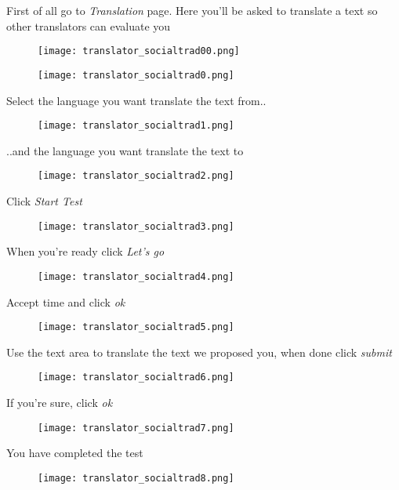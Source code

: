 \documentclass[11 pt, a4paper]{article}
\begin{document}
First of all go to \textit{Translation} page. Here you'll be asked to translate a text so other translators can evaluate you
\begin{figure}[H]
\centering
\texttt{[image: translator\_socialtrad00.png]}
\end{figure}

\begin{figure}[H]
\centering
\texttt{[image: translator\_socialtrad0.png]}
\end{figure}

Select the language you want translate the text from..
\begin{figure}[H]
\centering
\texttt{[image: translator\_socialtrad1.png]}
\end{figure}

..and the language you want translate the text to
\begin{figure}[H]
\centering
\texttt{[image: translator\_socialtrad2.png]}
\end{figure}

\clearpage
Click \textit{Start Test}
\begin{figure}[H]
\centering
\texttt{[image: translator\_socialtrad3.png]}
\end{figure}


When you're ready click \textit{Let's go}
\begin{figure}[H]
\centering
\texttt{[image: translator\_socialtrad4.png]}
\end{figure}

\clearpage
Accept time and click \textit{ok}
\begin{figure}[H]
\centering
\texttt{[image: translator\_socialtrad5.png]}
\end{figure}

Use the text area to translate the text we proposed you, when done click \textit{submit}
\begin{figure}[H]
\centering
\texttt{[image: translator\_socialtrad6.png]}
\end{figure}

\clearpage
If you're sure, click \textit{ok}
\begin{figure}[H]
\centering
\texttt{[image: translator\_socialtrad7.png]}
\end{figure}

You have completed the test
\begin{figure}[H]
\centering
\texttt{[image: translator\_socialtrad8.png]}
\end{figure}
\end{document}
